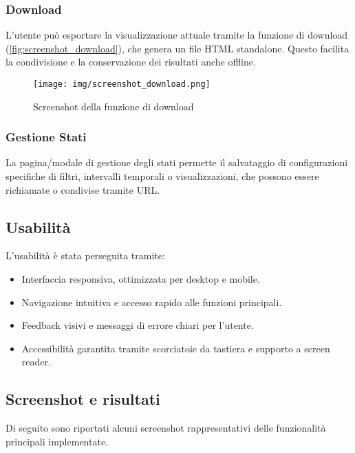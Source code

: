 \subsubsection{Download}

L’utente può esportare la visualizzazione attuale tramite la funzione di download (\autoref{fig:screenshot_download}), che genera un file HTML standalone. Questo facilita la condivisione e la conservazione dei risultati anche offline.

\vspace{0.5cm}
\begin{figure}[h!]
    \centering
    \texttt{[image: img/screenshot\_download.png]}
    \caption{Screenshot della funzione di download}
    \label{fig:screenshot_download}
\end{figure}
\vspace{0.5cm}

\subsubsection{Gestione Stati}

La pagina/modale di gestione degli stati permette il salvataggio di configurazioni specifiche di filtri, intervalli temporali o visualizzazioni, che possono essere richiamate o condivise tramite URL.

\subsection{Usabilità}

L’usabilità è stata perseguita tramite:
\begin{itemize}
    \item Interfaccia responsiva, ottimizzata per desktop e mobile.
    \item Navigazione intuitiva e accesso rapido alle funzioni principali.
    \item Feedback visivi e messaggi di errore chiari per l’utente.
    \item Accessibilità garantita tramite scorciatoie da tastiera e supporto a screen reader.
\end{itemize}

\subsection{Screenshot e risultati}

Di seguito sono riportati alcuni screenshot rappresentativi delle funzionalità principali implementate.

